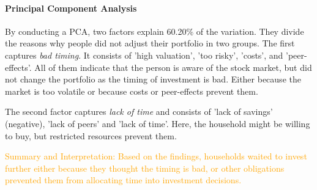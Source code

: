 \documentclass[ProjectABM]{subfiles}
\begin{document}

\paragraph{Principal Component Analysis}
By conducting a PCA, two factors explain 60.20\% of the variation. They divide the reasons why people did not adjust their portfolio in two groups. The first captures \textit{bad timing}. It consists of 'high valuation', 'too risky', 'costs', and 'peer-effects'. All of them indicate that the person is aware of the stock market, but did not change the portfolio as the timing of investment is bad. Either because the market is too volatile or because costs or peer-effects prevent them.

The second factor captures \textit{lack of time} and consists of 'lack of savings' (negative), 'lack of peers' and 'lack of time'. Here, the household might be willing to buy, but restricted resources prevent them.

\textcolor{orange}{Summary and Interpretation: Based on the findings, households waited to invest further either because they thought the timing is bad, or other obligations prevented them from allocating time into investment decisions.}

\begin{table}[]
	\caption{ Principal Component Analysis: No Adjustment}
	\label{tab:reason_unchanged}
\end{table}
\end{document}
